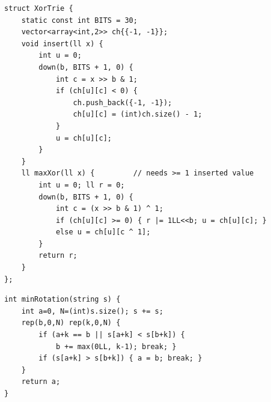 \begin{lstlisting}
struct XorTrie {
    static const int BITS = 30;
    vector<array<int,2>> ch{{-1, -1}};
    void insert(ll x) {
        int u = 0;
        down(b, BITS + 1, 0) {
            int c = x >> b & 1;
            if (ch[u][c] < 0) {
                ch.push_back({-1, -1});
                ch[u][c] = (int)ch.size() - 1;
            }
            u = ch[u][c];
        }
    }
    ll maxXor(ll x) {         // needs >= 1 inserted value
        int u = 0; ll r = 0;
        down(b, BITS + 1, 0) {
            int c = (x >> b & 1) ^ 1;
            if (ch[u][c] >= 0) { r |= 1LL<<b; u = ch[u][c]; }
            else u = ch[u][c ^ 1];
        }
        return r;
    }
};
\end{lstlisting}


\begin{lstlisting}
int minRotation(string s) {
    int a=0, N=(int)s.size(); s += s;
    rep(b,0,N) rep(k,0,N) {
        if (a+k == b || s[a+k] < s[b+k]) {
            b += max(0LL, k-1); break; }
        if (s[a+k] > s[b+k]) { a = b; break; }
    }
    return a;
}
\end{lstlisting}
